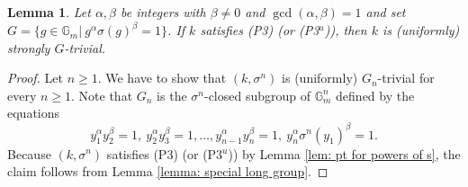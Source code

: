 \documentclass[oneside,reqno]{amsart}
\newtheorem{lemma}[theo]{Lemma}
\theoremstyle{definition}
\newcommand{\s}{\sigma}
\newcommand{\Gm}{\mathbb{G}_m}
\newcommand{\pt}{{\rm{(P3$^u$)}}}
\newcommand{\ptweak}{{\rm{(P3)}}}
\begin{document}
\begin{lemma} \label{lemma: special short group}
	Let $\alpha,\beta$ be integers with $\beta\neq 0$ and $\gcd(\alpha,\beta)=1$ and  set $G=\{g\in\Gm|\ g^{\alpha}\s(g)^{\beta}=1\}$. If $k$ satisfies \ptweak{} (or \pt{}), then $k$ is (uniformly) strongly $G$-trivial.
\end{lemma}
\begin{proof}
	Let $n\geq 1$. We have to show that $(k,\s^n)$ is (uniformly) $G_n$-trivial for every $n\geq 1$. Note that $G_n$ is the $\s^n$-closed subgroup of $\Gm^n$ defined by the equations
	$$y_1^{\alpha}y_2^{\beta}=1,\ y_2^{\alpha}y_3^{\beta}=1,\ldots, y_{n-1}^\alpha y_n^\beta=1,\ y_n^\alpha\s^n(y_1)^\beta=1.$$
	Because $(k,\s^n)$ satisfies \ptweak{} (or \pt{}) by Lemma \ref{lem: pt for powers of s}, the claim follows from Lemma \ref{lemma: special long group}.
\end{proof}
\end{document}
